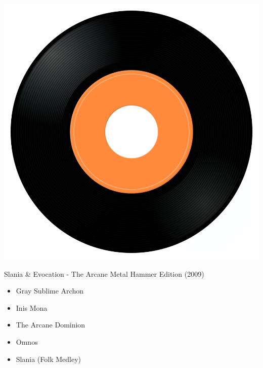 \begin{minipage}[t]{0.25\textwidth}
\captionsetup{type=figure}
\includegraphics[width=\textwidth]{Images/cover.png}
\caption*{Slania \& Evocation - The Arcane Metal Hammer Edition (2009)}
\end{minipage}
\begin{minipage}[t]{0.25\textwidth}\vspace{0pt}
\begin{itemize}[nosep,leftmargin=1em,labelwidth=*,align=left]
	\setlength{\itemsep}{0pt}
	\item Gray Sublime Archon
	\item Inis Mona
	\item The Arcane Dominion
	\item Omnos
	\item Slania (Folk Medley)
\end{itemize}
\end{minipage}
